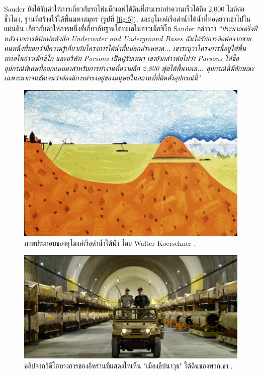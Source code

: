 \documentclass[10pt,twocolumn,letterpaper]{article}
\begin{document}
Sauder ยังได้รับคำให้การเกี่ยวกับรถไฟแม็กเลฟใต้ดินที่สามารถทำความเร็วได้ถึง 2,000 ไมล์ต่อชั่วโมง, ฐานที่สร้างไว้ใต้พื้นมหาสมุทร (รูปที่ \ref{fig:5}), และอุโมงค์เรือดำน้ำใต้น้ำที่ทอดยาวเข้าไปในแผ่นดิน เกี่ยวกับคำให้การหนึ่งที่เกี่ยวกับฐานใต้ทะเลในอ่าวเม็กซิโก Sauder กล่าวว่า \textit{"ประมาณครึ่งปีหลังจากการตีพิมพ์หนังสือ Underwater and Underground Bases ฉันได้รับการติดต่อจากชายคนหนึ่งที่บอกว่ามีความรู้เกี่ยวกับโครงการใต้น้ำที่แปลกประหลาด... เขาระบุว่าโครงการนี้อยู่ใต้พื้นทะเลในอ่าวเม็กซิโก และบริษัท Parsons เป็นผู้รับเหมา เขายังกล่าวต่อไปว่า Parsons ได้ซื้ออุปกรณ์พิเศษที่ออกแบบมาสำหรับการทำงานที่ความลึก 2,800 ฟุตใต้พื้นทะเล... อุปกรณ์นี้มีลักษณะเฉพาะมากจนชัดเจนว่าต้องมีการดำรงอยู่ของมนุษย์ในสถานที่ที่ติดตั้งอุปกรณ์นี้"} \cite{22}
\begin{figure}[t]
\begin{center}
   \includegraphics[width=1\linewidth]{sub.jpg}
\end{center}
   \caption{ภาพประกอบของอุโมงค์เรือดำน้ำใต้น้ำ โดย Walter Koerschner \cite{22,23}.}
\label{fig:6}
\label{fig:onecol}
\end{figure}
\begin{figure}[t]
\begin{center}
   \includegraphics[width=1\linewidth]{iran.jpeg}
\end{center}
   \caption{คลิปจากวิดีโอทางการของอิหร่านที่แสดงให้เห็น "เมืองขีปนาวุธ" ใต้ดินของพวกเขา \cite{39,40}.}
\label{fig:12}
\label{fig:onecol}
\end{figure}
\end{document}
